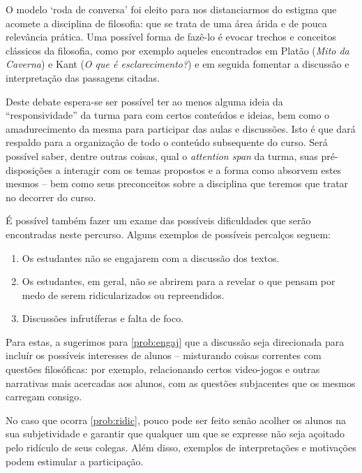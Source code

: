 \documentclass[12pt,a4paper]{article}
\newenvironment{citac}{
	\begin{addmargin}[4cm]{1em} \footnotesize}{\normalfont \end{addmargin}
}
\begin{document}
\begin{citac}
	O modelo `roda de conversa' foi eleito 
	para nos distanciarmos do estigma que acomete a disciplina de filosofia:
	que se trata de uma área árida e de pouca relevância prática.
	Uma possível forma de fazê-lo é evocar trechos e conceitos 
	clássicos da filosofia, como por exemplo aqueles encontrados em 
	Platão (\textit{Mito da Caverna}) e Kant (\textit{O que é 
	esclarecimento?}) e em seguida fomentar a discussão e interpretação das 
	passagens citadas.

	Deste debate espera-se ser possível ter ao menos alguma ideia da 
	``responsividade'' da turma para com certos conteúdos e ideias, 
	bem como o amadurecimento da mesma para participar das aulas 
	e discussões. Isto é que dará respaldo para a organização de 
	todo o conteúdo subsequente do curso. Será possível saber, dentre 
	outras coisas, qual o \emph{attention span} da turma, suas 
	pré-disposições a interagir com os temas propostos e a forma 
	como absorvem estes mesmos -- bem como seus preconceitos sobre 
	a disciplina que teremos que tratar no decorrer do curso. 
	
	É possível também fazer um exame das possíveis dificuldades 
	que serão encontradas neste percurso. Alguns exemplos de possíveis 
	percalços seguem:

	\begin{enumerate}[label=\alph*)]
		\item	\label{prob:engaj} 
			Os estudantes não se engajarem com a discussão 
			dos textos.

		\item	\label{prob:ridic}
			Os estudantes, em geral, não se abrirem para a 
			revelar o que pensam por medo de serem ridicularizados
			ou repreendidos.

		\item	\label{prob:disc}
			Discussões infrutíferas e falta de foco.
	\end{enumerate}
	
	Para estas, a sugerimos para \ref{prob:engaj} que a discussão
	seja direcionada para incluír os possíveis interesses de alunos
	-- misturando coisas correntes com questões filosóficas: por
	exemplo, relacionando certos video-jogos e outras narrativas 
	mais acercadas aos alunos, com as questões subjacentes que os 
	mesmos carregam consigo. 
	
	No caso que ocorra \ref{prob:ridic}, pouco pode ser feito senão
	acolher os alunos na sua subjetividade e garantir que qualquer 
	um que se expresse não seja açoitado pelo ridículo de seus 
	colegas. Além disso, exemplos de interpretações e motivações 
	podem estimular a participação.


\end{citac}
\end{document}
